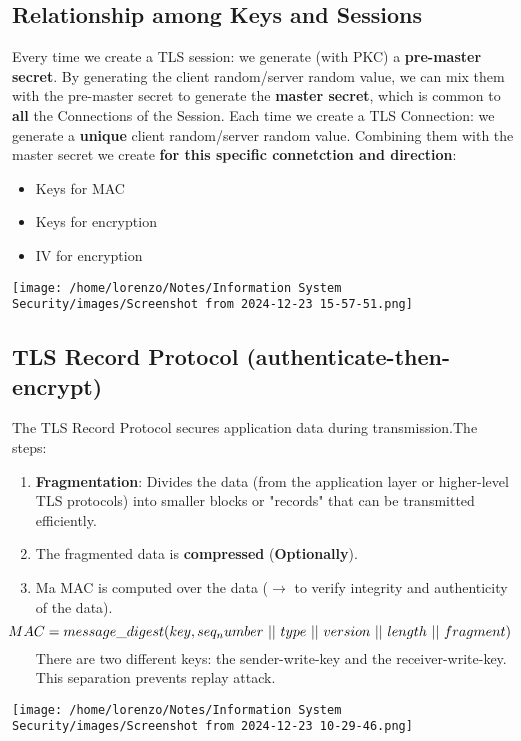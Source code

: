 \subsection{Relationship among Keys and Sessions}
\begin{minipage}{0.6\textwidth}
Every time we create a TLS session: we generate (with PKC) a \textbf{pre-master secret}. By generating the client random/server random value, we can mix them with the pre-master secret to generate the \textbf{master secret}, which is common to \textbf{all} the Connections of the Session. Each time we create a TLS Connection: we generate a \textbf{unique} client random/server random value. Combining them with the master secret we create \textbf{for this specific connetction and direction}:
\begin{itemize}
    \item Keys for MAC
    \item Keys for encryption
    \item IV for encryption
\end{itemize}
\end{minipage} 
\hspace{0.3cm}
\begin{minipage}{0.4\textwidth}
    \centering
    \texttt{[image: /home/lorenzo/Notes/Information System Security/images/Screenshot from 2024-12-23 15-57-51.png]}
\end{minipage}

\subsection{TLS Record Protocol (authenticate-then-encrypt)}
The TLS Record Protocol secures application data during transmission.The steps:
\\
\begin{minipage}{0.6\textwidth}
\vspace{0.5cm}
\begin{enumerate}
\item \textbf{Fragmentation}: Divides the data (from the application layer or higher-level TLS protocols) into smaller blocks or "records" that can be transmitted efficiently.
\item The fragmented data is \textbf{compressed} (\textbf{Optionally}).
\item Ma MAC is computed over the data (\(\rightarrow\) to verify integrity and authenticity of the data).
\[ 
\hspace{-0.8cm}
MAC = message\_digest(key,seq_number\ ||\ type\ ||\ version\ ||\ length\ ||\ fragment)
\]
There are two different keys: the sender-write-key  and the receiver-write-key. This separation prevents replay attack.

\end{enumerate}
\end{minipage} 
\hspace{0.9cm}
\begin{minipage}{0.4\textwidth}
    \centering
    \texttt{[image: /home/lorenzo/Notes/Information System Security/images/Screenshot from 2024-12-23 10-29-46.png]}
\end{minipage}

